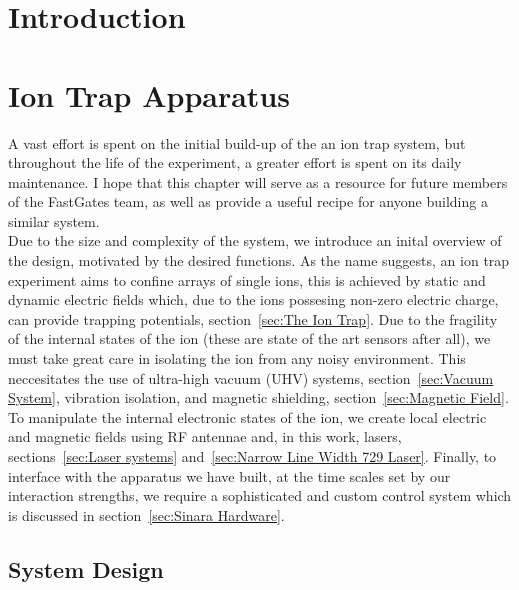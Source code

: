 \documentclass[12pt]{report}
\begin{document}

\chapter{Introduction}



\chapter{Ion Trap Apparatus}
    A vast effort is spent on the initial build-up of the an ion trap system, but
    throughout the life of the experiment, a greater effort is spent on its daily
    maintenance.  I hope that this chapter will serve as a resource for future
    members of the FastGates team, as well as provide a useful recipe for anyone
    building a similar system. \\

    Due to the size and complexity of the system, we introduce an inital overview of
    the design, motivated by the desired functions.  As the name suggests, an ion
    trap experiment aims to confine arrays of single ions, this is achieved by
    static and dynamic electric fields which, due to the ions possesing non-zero
    electric charge, can provide trapping potentials, section~\ref{sec:The Ion
    Trap}. Due to the fragility of the internal states of the ion (these are state
    of the art sensors after all), we must take great care in isolating the ion from
    any noisy environment. This neccesitates the use of ultra-high vacuum (UHV)
    systems, section~\ref{sec:Vacuum System}, vibration isolation, and magnetic
    shielding, section~\ref{sec:Magnetic Field}. To manipulate the internal electronic states of the ion, we create
    local electric and magnetic fields using RF antennae and, in this work, lasers,
    sections~\ref{sec:Laser systems} and~\ref{sec:Narrow Line Width 729 Laser}.
    Finally, to interface with the apparatus we have built, at the time scales set by our interaction strengths, we require a sophisticated and custom control system which is discussed in section~\ref{sec:Sinara Hardware}.

\section{System Design}
\label{sec:System Design}
\end{document}
